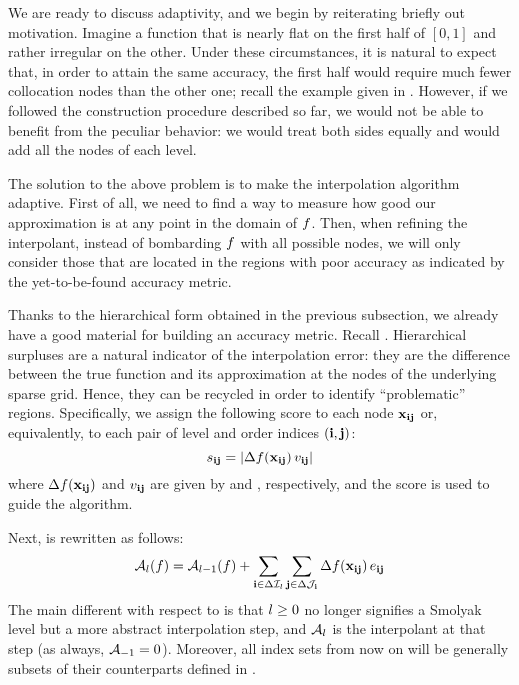 We are ready to discuss adaptivity, and we begin by reiterating briefly out
motivation. Imagine a function that is nearly flat on the first half of $[0, 1]$
and rather irregular on the other. Under these circumstances, it is natural to
expect that, in order to attain the same accuracy, the first half would require
much fewer collocation nodes than the other one; recall the example given in
. However, if we followed the construction procedure described
so far, we would not be able to benefit from the peculiar behavior: we would
treat both sides equally and would add all the nodes of each level.

The solution to the above problem is to make the interpolation algorithm
adaptive. First of all, we need to find a way to measure how good our
approximation is at any point in the domain of $f$. Then, when refining the
interpolant, instead of bombarding $f$ with all possible nodes, we will only
consider those that are located in the regions with poor accuracy as indicated
by the yet-to-be-found accuracy metric.

Thanks to the hierarchical form obtained in the previous subsection, we already
have a good material for building an accuracy metric. Recall .
Hierarchical surpluses are a natural indicator of the interpolation error: they
are the difference between the true function and its approximation at the nodes
of the underlying sparse grid. Hence, they can be recycled in order to identify
``problematic'' regions. Specifically, we assign the following score to each
node $\mathbf{x}_{\mathbf{i}\mathbf{j}}$ or, equivalently, to each pair of level and order indices
$(\mathbf{i}, \mathbf{j})$:
\begin{equation} \elab{score}
  \score_{\vi\vj} = \left| \surplus(\vx_{\vi\vj}) \, \w_{\vi\vj} \right|
\end{equation}
where $\Delta f(\mathbf{x}_{\mathbf{i}\mathbf{j}})$ and $v_{\mathbf{i}\mathbf{j}}$ are given by  and
, respectively, and the score is used to guide the algorithm.

Next,  is rewritten as follows:
\begin{equation} \elab{approximation}
  \approximation{\l}(\f) = \approximation{\l-1}(\f) + \sum_{\vi \in \Delta\lindex_\l} \sum_{\vj \in \Delta\oindex_\vi} \surplus(\vx_{\vi\vj}) \, \e_{\vi\vj}
\end{equation}
The main different with respect to  is that $l \geq
0$ no longer signifies a Smolyak level but a more abstract interpolation step,
and $\mathcal{A}_{l}$ is the interpolant at that step (as always,
$\mathcal{A}_{-1} = 0$). Moreover, all index sets from now on will be
generally subsets of their counterparts defined in .

